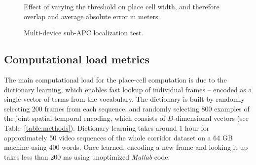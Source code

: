 \begin{figure}[h!]
\centering
\setlength{}
	\setlength{} 
\caption{Effect of varying the threshold on place cell width, and therefore overlap and average absolute error in meters.}
\label{fig:threshEval}
\end{figure}


\begin{figure}
\centering
\setlength{}
	\setlength{}
		
\caption{Multi-device sub-APC localization test.}
\label{fig:multiDevice}
\end{figure}



%		



%	
%
%		

\subsection{Computational load metrics}
The main computational load for the place-cell computation is due to the dictionary learning, which enables fast lookup of individual frames -- encoded as a single vector of terms from the vocabulary.  The dictionary is built by randomly selecting 200 frames from each sequence, and randomly selecting 800 examples of the joint spatial-temporal encoding, which consists of $D$-dimensional vectors (see Table~\ref{table:methods}). Dictionary learning takes around 1 hour for approximately 50 video sequences of the whole corridor dataset on a 64 GB machine using 400 words. Once learned, encoding a new frame and looking it up takes less than 200 ms using unoptimized {\it Matlab} code. 

